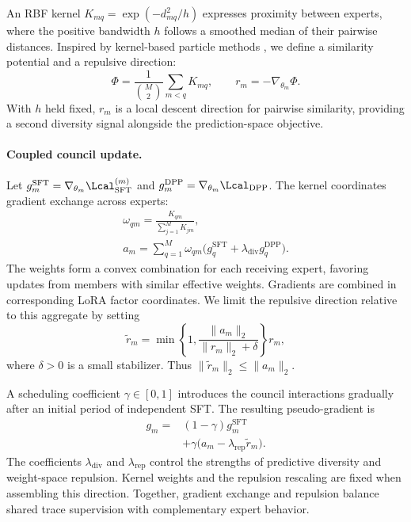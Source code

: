 An RBF kernel $K_{mq}=\exp(-d_{mq}^{2}/h)$ expresses proximity between
experts, where the positive bandwidth $h$ follows a smoothed median of their
pairwise distances. Inspired by kernel-based particle methods
\citep{liu2016svgd}, we define a similarity potential and a repulsive direction:
\begin{equation}
 \Phi=\frac{1}{\binom{M}{2}}\sum_{m<q}K_{mq},
 \qquad r_m=-\nabla_{\theta_m}\Phi.
 \label{eq:stage1-repulsion}
\end{equation}
With $h$ held fixed, $r_m$ is a local descent direction for pairwise similarity,
providing a second diversity signal alongside the prediction-space objective.

\paragraph{Coupled council update.}
Let $g_m^{\mathrm{SFT}}=\nabla_{\theta_m}\Lcal_{\mathrm{SFT}}^{(m)}$ and
$g_m^{\mathrm{DPP}}=\nabla_{\theta_m}\Lcal_{\mathrm{DPP}}$. The kernel
coordinates gradient exchange across experts:
\begin{equation}
 \begin{gathered}
 \omega_{qm}=\frac{K_{qm}}{\sum_{j=1}^{M}K_{jm}},\\
 a_m=\sum_{q=1}^{M}\omega_{qm}
       \bigl(g_q^{\mathrm{SFT}}+\lambda_{\mathrm{div}}g_q^{\mathrm{DPP}}\bigr).
 \end{gathered}
 \label{eq:stage1-mixing}
\end{equation}
The weights form a convex combination for each receiving expert, favoring
updates from members with similar effective weights. Gradients are combined
in corresponding LoRA factor coordinates. We limit the repulsive direction
relative to this aggregate by setting
\begin{equation}
 \widetilde r_m=
 \min\left\{1,\frac{\|a_m\|_2}{\|r_m\|_2+\delta}\right\}r_m,
 \label{eq:stage1-repulsion-cap}
\end{equation}
where $\delta>0$ is a small stabilizer. Thus
$\|\widetilde r_m\|_2\le\|a_m\|_2$.

A scheduling coefficient $\gamma\in[0,1]$ introduces the council interactions
gradually after an initial period of independent SFT. The resulting
pseudo-gradient is
\begin{equation}
 \begin{aligned}
 g_m={}&(1-\gamma)g_m^{\mathrm{SFT}}\\
       &+\gamma\bigl(a_m-\lambda_{\mathrm{rep}}\widetilde r_m\bigr).
 \end{aligned}
 \label{eq:stage1-update}
\end{equation}
The coefficients $\lambda_{\mathrm{div}}$ and $\lambda_{\mathrm{rep}}$ control
the strengths of predictive diversity and weight-space repulsion. Kernel
weights and the repulsion rescaling are fixed when assembling this direction.
Together, gradient exchange and repulsion balance shared trace supervision
with complementary expert behavior.
